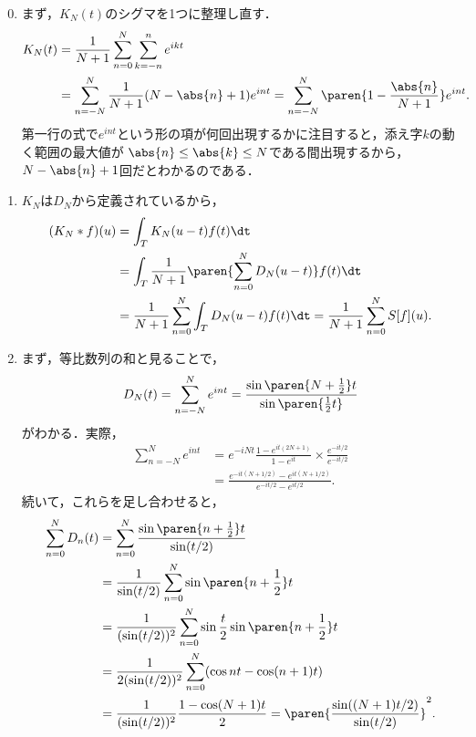 \documentclass[uplatex,dvipdfmx]{jsreport}
\begin{document}
\begin{Proof}\mbox{}
    \begin{enumerate}\setcounter{enumi}{-1}
        \item まず，$K_N(t)$のシグマを1つに整理し直す．
        \begin{align*}
            K_N(t)&=\frac{1}{N+1}\sum_{n=0}^N\sum_{k=-n}^ne^{ikt}\\
            &=\sum_{n=-N}^N\frac{1}{N+1}(N-\abs{n}+1)e^{int}=\sum_{n=-N}^N\paren{1-\frac{\abs{n}}{N+1}}e^{int}.
        \end{align*}
        第一行の式で$e^{int}$という形の項が何回出現するかに注目すると，添え字$k$の動く範囲の最大値が
        $\abs{n}\le\abs{k}\le N$である間出現するから，$N-\abs{n}+1$回だとわかるのである．
        \item $K_N$は$D_N$から定義されているから，
        \begin{align*}
            (K_N*f)(u)&=\int_TK_N(u-t)f(t)\dt\\
            &=\int_T\frac{1}{N+1}\paren{\sum_{n=0}^ND_N(u-t)}f(t)\dt\\
            &=\frac{1}{N+1}\sum_{n=0}^N\int_TD_N(u-t)f(t)\dt=\frac{1}{N+1}\sum_{n=0}^NS[f](u).
        \end{align*}
        \item まず，等比数列の和と見ることで，
        \[D_N(t)=\sum_{n=-N}^Ne^{int}=\frac{\sin\paren{N+\frac{1}{2}}t}{\sin\paren{\frac{1}{2}t}}\]
        がわかる．実際，
        \begin{align*}
            \sum_{n=-N}^Ne^{int}&=e^{-iNt}\frac{1-e^{it(2N+1)}}{1-e^{it}}\times\frac{e^{-it/2}}{e^{-it/2}}\\
            &=\frac{e^{-it(N+1/2)}-e^{it(N+1/2)}}{e^{-it/2}-e^{it/2}}.
        \end{align*}
        続いて，これらを足し合わせると，
        \begin{align*}
            \sum_{n=0}^ND_n(t)&=\sum_{n=0}^N\frac{\sin\paren{n+\frac{1}{2}}t}{\sin(t/2)}\\
            &=\frac{1}{\sin(t/2)}\sum_{n=0}^N\sin\paren{n+\frac{1}{2}}t\\
            &=\frac{1}{(\sin(t/2))^2}\sum_{n=0}^N\sin\frac{t}{2}\sin\paren{n+\frac{1}{2}}t\\
            &=\frac{1}{2(\sin(t/2))^2}\sum_{n=0}^N(\cos nt-\cos(n+1)t)\\
            &=\frac{1}{(\sin(t/2))^2}\frac{1-\cos(N+1)t}{2}=\paren{\frac{\sin((N+1)t/2)}{\sin(t/2)}}^2.
        \end{align*}

\end{enumerate}
\end{Proof}
\end{document}
